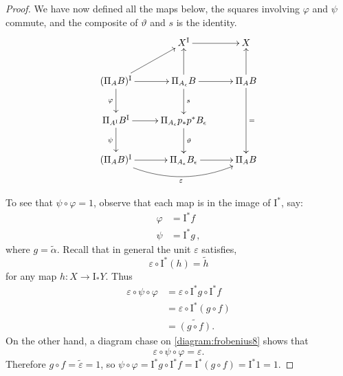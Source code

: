 \documentclass[12pt]{article}
\newcommand{\ra}{\ensuremath{\rightarrow}}
\newcommand{\I}{\ensuremath{\mathrm{I}}}
\theoremstyle{remark}
\theoremstyle{definition}
\begin{document}
\begin{proof}
We  have now defined all the maps below, the squares involving $\varphi$ and $\psi$ commute, and the  composite of $\vartheta$ and $s$  is the identity.
\begin{equation}\label{diagram:frobenius8}
\xymatrix{
& X^\I \ar[r] & X \\
 (\Pi_AB)^\I  \ar[r]  \ar[ru] \ar[d]_{\varphi} & \Pi_{A_\epsilon}B  \ar[u] \ar[d]^s \ar[r] & \Pi_{A}B \ar[u]\ar[dd]^= \\
 \Pi_{A^\I}B^\I \ar[r] \ar[d]_{\psi} & \Pi_{A_\epsilon} p_*p^* B_\epsilon \ar[d]^\vartheta & \\
  (\Pi_AB)^\I  \ar[r] \ar@/_4ex/ [rr]_\varepsilon & \Pi_{A_\epsilon}B_\epsilon \ar[r] & \Pi_{A}B 
}
\end{equation}

To see that $\psi\circ\varphi = 1$, observe that each map is in the image of $\I^*$, say:
\begin{align*}
\varphi &= \I^*f\\
\psi &= \I^*g\,,
\end{align*}
where  $g = \tilde{\alpha}$.
Recall that  in general the unit $\varepsilon$ satisfies, 
\[
\varepsilon\circ \I^*(h) = \tilde{h}
\]
for any map $h : X \ra \I_*Y$.  Thus
\begin{align*}
\varepsilon\circ\psi\circ\varphi &= \varepsilon\circ\I^*g\circ\I^*f\\
&= \varepsilon\circ\I^*(g\circ f)\\
&= \widetilde{(g\circ f)}.
\end{align*}
On the other hand, a diagram chase on \eqref{diagram:frobenius8} shows that 
\[
\varepsilon\circ\psi\circ\varphi = \varepsilon.
\]
Therefore $g\circ f = \tilde{\varepsilon} = 1$, so $\psi\circ\varphi = \I^*g\circ\I^*f = \I^*(g\circ f) = \I^*1 = 1$.


\end{proof}
\end{document}
